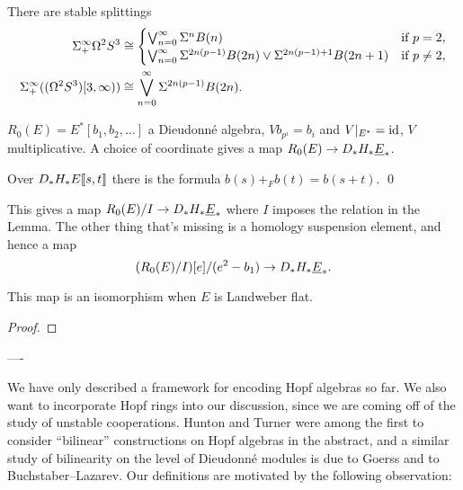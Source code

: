 \begin{lemma}
There are stable splittings
\begin{align*}
\Sigma^\infty_+ \Omega^2 S^3 & \cong \begin{cases} \bigvee_{n=0}^\infty \Sigma^n B(n) & \text{if $p = 2$}, \\ \bigvee_{n=0}^\infty \Sigma^{2n(p-1)} B(2n) \vee \Sigma^{2n(p-1) + 1} B(2n+1) & \text{if $p \ne 2$}, \end{cases} \\
\Sigma^\infty_+ ((\Omega^2 S^3)[3, \infty)) & \cong \bigvee_{n=0}^\infty \Sigma^{2n(p-1)} B(2n).
\end{align*}
\end{lemma}



$R_0(E) = E^*[b_1, b_2, \ldots]$ a Dieudonn\'e algebra, $V b_{p^i} = b_i$ and $V|_{E^*} = \mathrm{id}$, $V$ multiplicative.  A choice of coordinate gives a map $R_0(E) \to D_* H_* \underline{\smash{E}}_{*}$.

\begin{lemma}
Over $D_* H_* E\llbracket{s, t}\rrbracket$ there is the formula $b(s) +_F b(t) = b(s + t)$. \qed
\end{lemma}

This gives a map $R_0(E) / I \to D_* H_* \underline{\smash{E}}_{*}$ where $I$ imposes the relation in the Lemma.  The other thing that's missing is a homology suspension element, and hence a map \[(R_0(E) / I)[e] / (e^2 - b_1) \to D_* H_* \underline{\smash{E}}_{*}.\] 

\begin{theorem}
This map is an isomorphism when $E$ is Landweber flat.
\end{theorem}
\begin{proof}

\end{proof}
















----


We have only described a framework for encoding Hopf algebras so far.  We also want to incorporate Hopf rings into our discussion, since we are coming off of the study of unstable cooperations.  Hunton and Turner were among the first to consider ``bilinear'' constructions on Hopf algebras in the abstract, and a similar study of bilinearity on the level of Dieudonn\'e modules is due to Goerss and to Buchstaber--Lazarev.  Our definitions are motivated by the following observation:

